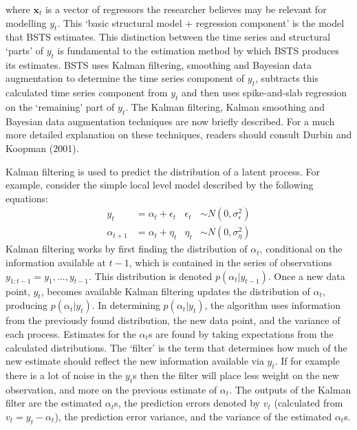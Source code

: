 where $\textbf{x}_{t}$ is a vector of regressors the researcher believes may be relevant for modelling $y_{t}$. This `basic structural model + regression component' is the model that BSTS estimates. This distinction between the time series and structural `parts' of $y_{t}$ is fundamental to the estimation method by which BSTS produces its estimates. BSTS uses Kalman filtering, smoothing and Bayesian data augmentation to determine the time series component of $y_{t}$, subtracts this calculated time series component from $y_{t}$ and then uses spike-and-slab regression on the `remaining' part of $y_{t}$. The Kalman filtering, Kalman smoothing and Bayesian data augmentation techniques are now briefly described. For a much more detailed explanation on these techniques, readers should consult Durbin and Koopman (2001). 

  
Kalman filtering is used to predict the distribution of a latent process. For example, consider the simple local level model described by the following equations:
\begin{align*}
y_{t} &= \alpha_{t} + \epsilon_{t}  & \epsilon_{t} &\sim N(0, \sigma_{\epsilon}^{2}) \\
\alpha_{t+1} &= \alpha_{t} + \eta_{t} &  \eta_{t} &\sim N(0, \sigma_{\eta}^{2})
\end{align*}
Kalman filtering works by first finding the distribution of $\alpha_{t}$, conditional on the information available at $t-1$, which is contained in the series of observations $y_{1:t-1}=y_{1},...,y_{t-1}$. This distribution is denoted $p(\alpha_{t} | y_{t-1})$. Once a new data point, $y_{t}$, becomes available Kalman filtering updates the distribution of $\alpha_{t}$, producing  $p(\alpha_{t} | y_{t})$. In determining  $p(\alpha_{t} | y_{t})$, the algorithm uses information from  the previously found distribution, the new data point, and the variance of each process. Estimates for the $\alpha_t$s are found by taking  expectations from the calculated distributions. The `filter' is the term that determines how much of the new estimate should reflect the new information available via $y_{t}$. If for example there is a lot of noise in the $y_{t}$s then the filter will place less weight on the new observation, and more on the previous estimate of $\alpha_{t}$. The outputs of the Kalman filter are the estimated $\alpha_{t}$s, the prediction errors denoted by $v_{t}$ (calculated from $v_{t} = y_{t}-\alpha_{t}$),  the prediction error variance, and the variance of the estimated $\alpha_{t}$s.
 

